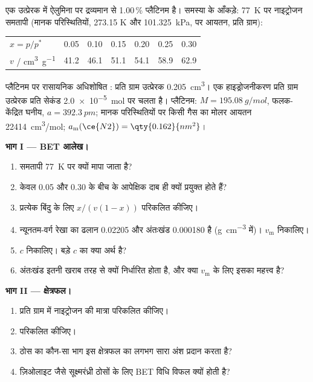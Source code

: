 \begin{problem}
\label{pb:b3:surfaces-catalysis:1}
एक उत्प्रेरक में ऐलुमिना पर द्रव्यमान से 1.00\,\% प्लैटिनम है। समस्या के आँकड़े:
\qty{77}{K} पर नाइट्रोजन समतापी (मानक परिस्थितियों, 273.15 K और
\qty{101.325}{kPa}, पर आयतन, प्रति ग्राम):
\begin{center}\small
\begin{tabular}{lcccccc}
\hline
$x = p/p^*$ & 0.05 & 0.10 & 0.15 & 0.20 & 0.25 & 0.30 \\
$v$ / \unit{cm^3.g^{-1}} & 41.2 & 46.1 & 51.1 & 54.1 & 58.9 & 62.9 \\ \hline
\end{tabular}
\end{center}
प्लैटिनम पर रासायनिक अधिशोषित : प्रति ग्राम उत्प्रेरक \qty{0.205}{cm^3}। एक हाइड्रोजनीकरण
प्रति ग्राम उत्प्रेरक प्रति सेकंड \qty{2.0e-5}{mol} पर चलता है। प्लैटिनम: $M = \qty{195.08}{g/mol}$, फलक-केंद्रित घनीय,
$a = \qty{392.3}{pm}$; मानक परिस्थितियों पर किसी गैस का मोलर आयतन \qty{22414}{cm^3/mol};
$a_{\mathrm m}(\ce{N2}) = \qty{0.162}{nm^2}$।

\medskip\noindent\textbf{भाग I --- BET आलेख।}
\begin{enumerate}
  \item समतापी \qty{77}{K} पर क्यों मापा जाता है?
  \item केवल 0.05 और 0.30 के बीच के आपेक्षिक दाब ही क्यों प्रयुक्त होते हैं?
  \item प्रत्येक बिंदु के लिए $x/(v(1 - x))$ परिकलित कीजिए।
  \item न्यूनतम-वर्ग रेखा का ढलान \num{0.02205} और अंतःखंड \num{0.000180} है
        (\unit{g.cm^{-3}} में)। $v_{\mathrm m}$ निकालिए।
  \item $c$ निकालिए। बड़े $c$ का क्या अर्थ है?
  \item अंतःखंड इतनी खराब तरह से क्यों निर्धारित होता है, और क्या $v_{\mathrm m}$ के लिए इसका महत्त्व है?
\end{enumerate}

\medskip\noindent\textbf{भाग II --- क्षेत्रफल।}
\begin{enumerate}[resume]
  \item प्रति ग्राम  में नाइट्रोजन की मात्रा परिकलित कीजिए।
  \item {} परिकलित कीजिए।
  \item ठोस का कौन-सा भाग इस क्षेत्रफल का लगभग सारा अंश प्रदान करता है?
  \item ज़िओलाइट जैसे सूक्ष्मरंध्री ठोसों के लिए BET विधि विफल क्यों होती है?
\end{enumerate}


\end{problem}
